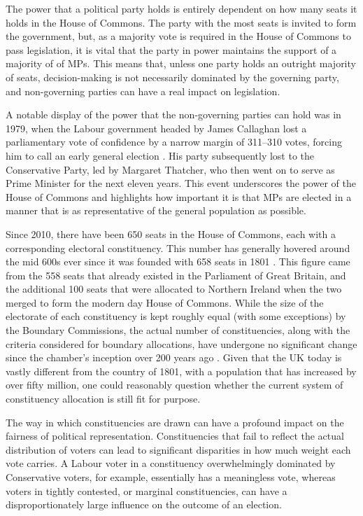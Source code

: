 \documentclass{article}
\begin{document}
The power that a political party holds is entirely dependent on how many seats it holds in the House of Commons. The party with the most seats is invited to form the government, 
but, as a majority vote is required in the House of Commons to pass legislation, it is vital that the party in power maintains the support of a majority of of MPs. This means that,
unless one party holds an outright majority of seats, decision-making is not necessarily dominated by the governing party, and non-governing parties can have a real impact on 
legislation.

A notable display of the power that the non-governing parties can hold was in 1979, when the Labour government headed by James Callaghan lost a parliamentary vote of confidence
by a narrow margin of 311--310 votes, forcing him to call an early general election \cite{callaghan}. His party subsequently lost to the Conservative Party, led by Margaret Thatcher, who then went on to
serve as Prime Minister for the next eleven years. This event underscores the power of the House of Commons and highlights how important it is that MPs are elected in a manner
that is as representative of the general population as possible.

Since 2010, there have been 650 seats in the House of Commons, each with a corresponding electoral constituency. This number has generally hovered around the mid 600s ever since it was founded
with 658 seats in 1801 \cite{numofseats}. This figure came from the 558 seats that already existed in the Parliament 
of Great Britain, and the additional 100 seats that were allocated to Northern Ireland when the two merged to form the modern day House of Commons. 
While the size of the electorate of each constituency is kept roughly equal  (with some exceptions) by the Boundary Commissions, the actual number of constituencies, along
with the criteria considered for boundary allocations, have undergone no significant change since the chamber's inception over 200 years ago \cite{parlcons}.
Given that the UK today is vastly different from the country of 1801, with a population that has increased by over fifty million, one could reasonably question
whether the current system of constituency allocation is still fit for purpose.

The way in which constituencies are drawn can have a profound impact on the fairness of political representation. Constituencies that fail to reflect the actual distribution of voters can lead to 
significant disparities in how much weight each vote carries. A Labour voter in a constituency overwhelmingly dominated by Conservative voters, for example, essentially has a meaningless
vote, whereas voters in tightly contested, or marginal constituencies, can have a disproportionately large influence on the outcome of an election. 
\end{document}

